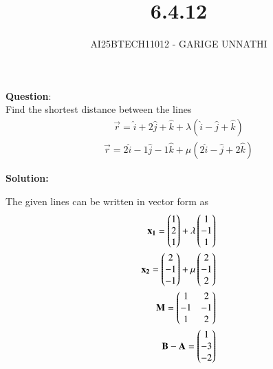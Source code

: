 \documentclass[journal]{IEEEtran}
\begin{document}



\title{6.4.12}
\author{AI25BTECH11012 - GARIGE UNNATHI}
{\let\newpage\relax\maketitle}


\renewcommand{\thefigure}{\theenumi}
\renewcommand{\thetable}{\theenumi}
\setlength{\intextsep}{10pt} %



\vspace{-1cm}

\textbf{Question}:\\
Find the shortest distance between the lines
\begin{align*}
 \vec{r} = \hat{i}+2\hat{j}+\hat{k} +\lambda(\hat{i}-\hat{j}+\hat{k})
\end{align*}
\begin{align*}
    \vec{r} =  2\hat{i}-1\hat{j}-1\hat{k} +\mu(2\hat{i}-\hat{j}+2\hat{k})
\end{align*}


\textbf{Solution: }

The given lines can be written in vector form as
\begin{align}
    \mathbf{x_1} = \begin{pmatrix}1 \\2 \\1\end{pmatrix} + \lambda\begin{pmatrix}1 \\-1 \\1\end{pmatrix}\\
    \mathbf{x_2} = \begin{pmatrix}2 \\-1 \\-1\end{pmatrix} + \mu\begin{pmatrix}2 \\ -1\\ 2\end{pmatrix}\\
    \mathbf{M} = \begin{pmatrix}1 & 2 \\ -1 & -1\\1 & 2\end{pmatrix} \\
    \mathbf{B}-\mathbf{A} = \begin{pmatrix}1 \\ -3 \\-2\end{pmatrix}
\end{align}
\end{document}
